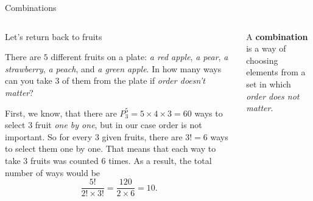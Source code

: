 \documentclass[9pt,aspectratio=169]{beamer}
\begin{document}
\begin{frame}{Combinations}
  \begin{columns}[T]
    \begin{column}{0.5\textwidth}
      Let’s return back to fruits

      \begin{problem}
        There are $5$ different fruits on a plate: \emph{a red apple}, \emph{a pear}, \emph{a strawberry}, \emph{a peach}, and \emph{a green apple}. In how many ways can you take $3$ of them from the plate if \emph{order doesn’t matter}?
      \end{problem}

      \begin{nscenter}
      \end{nscenter}

      First, we know, that there are $P_3^5 = 5 \times 4 \times 3 = 60$ ways to select $3$ fruit \emph{one by one}, but in our case order is not important. So for every $3$ given fruits, there are $3! = 6$ ways to select them one by one. That means that each way to take $3$ fruits was counted $6$ times. As a result, the total number of ways would be 
      \[
        \frac{5!}{2! \times 3!} = \frac{120}{2 \times 6} = 10.
      \]
    \end{column}
    \begin{column}{0.5\textwidth}
      \begin{definition}
        A \textbf{combination} is a way of choosing elements from a set in which \emph{order does not matter}.
      \end{definition}


\end{column}
\end{columns}
\end{frame}
\end{document}
